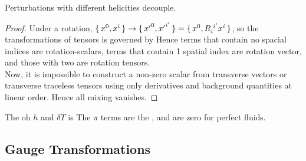 \documentclass{article}
\begin{document}
\begin{theorem}
Perturbations with different helicities decouple.
\end{theorem}
\begin{proof}
Under a rotation, $\set{x^0,x^i} \to \set{{x^\prime}^0,{x^\prime}^{i^\prime}}=\set{x^0, R\indices{_i^{i^\prime}} x^i}$, so the transformations of tensors is governed by 
Hence terms that contain no spacial indices are rotation-scalars, terms that contain 1 spatial index are rotation vector, and those with two are rotation tensors. \\
Now, it is impossible to construct a non-zero scalar from transverse vectors or transverse traceless tensors using only derivatives and background quantities at linear order. Hence all mixing vanishes. 
\end{proof}

\begin{definition}
The  oh $h$ and $\delta T $ is 
The $\pi$ terms are the , and are zero for perfect fluids. 
\end{definition}

\subsection{Gauge Transformations}
\end{document}
